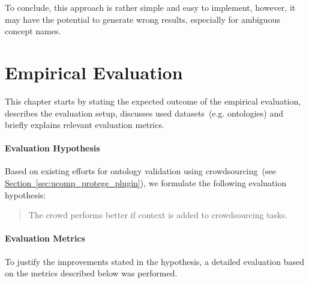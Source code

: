 \documentclass[draft,final]{vutinfth} %
\begin{document}
To conclude, this approach is rather simple and easy to implement, however, it may have the potential to generate wrong results, especially for ambiguous concept names. 


\chapter{Empirical Evaluation}
This chapter starts by stating the expected outcome of the empirical evaluation, describes the evaluation setup, discusses used datasets~(e.g. ontologies) and briefly explains relevant evaluation metrics. 

\subsubsection{Evaluation Hypothesis}
Based on existing efforts for ontology validation using crowdsourcing~(see \hyperref[sec:ucomp_protege_plugin]{Section~\ref*{sec:ucomp_protege_plugin}}), we formulate the following evaluation hypothesis:
\begin{quotation}
	The crowd performs better if context is added to crowdsourcing tasks.
\end{quotation}

\subsubsection{Evaluation Metrics}
To justify the improvements stated in the hypothesis, a detailed evaluation based on the metrics described below was performed. 
\end{document}
